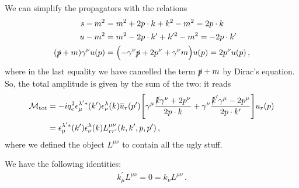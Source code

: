 \documentclass[main.tex]{subfiles}
\begin{document}
We can simplify the propagators with the relations 
%
\begin{align}
s - m^2 &= m^2+ 2 p \cdot k + k^2 - m^2 = 2 p \cdot k  \\
u - m^2 &= m^2- 2 p \cdot k' + k^{\prime 2} - m^2 = -2 p \cdot k'  \\
(\slashed{p} + m)\gamma^{\nu } u(p) &= 
\qty(- \gamma^{\nu} \slashed{p} + 2 p^{\nu } + \gamma^{\nu }m) u(p) = 2 p^{\nu } u(p)
\,,
\end{align}
%
where in the last equality we have cancelled the term \(\slashed{p} + m\) by Dirac's equation. So, the total amplitude is given by the sum of the two: it reads 
%
\begin{align}
\mathcal{M} _{\text{tot}}
&= - i q_e^2 
\epsilon^{\lambda^{\prime} *}_{\mu } (k')
\epsilon^{\lambda }_{\nu } (k)
\overline{u}_{r} (p') \qty[\gamma^{\mu } \frac{\slashed{k} \gamma^{\nu } + 2 p^{\nu }}{2 p \cdot k} + \gamma^{\nu } \frac{\slashed{k}' \gamma^{\mu} - 2 p^{\mu }}{2 p \cdot k'}] u_r (p)  \\
&= \epsilon^{\lambda^{\prime} *}_{\mu } (k')
\epsilon^{\lambda }_{\nu } (k)
L^{\mu \nu }_{r r '} (k, k', p, p')
\,,
\end{align}
%
where we defined the object \(L^{\mu \nu }\) to contain all the ugly stuff. 

\begin{claim}
We have the following identities: 
%
\begin{align}
k^{\prime }_{\mu } L^{\mu \nu } = 0 = k_\nu L^{\mu \nu }
\,.
\end{align}
\end{claim}
\end{document}
